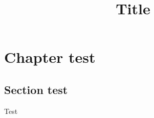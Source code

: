 \documentclass[a4paper,12pt,twoside]{book}
\title{Title}
\begin{document}
\setlength{\baselineskip}{.55cm}



\newpage
\pagestyle{intr}

\newpage

\pagestyle{toc}
\tableofcontents
\newpage

\pagestyle{toenv}
\listoftheorems
\newpage

\pagestyle{nor}
\chapter{Chapter test}
\section{Section test}
\begin{definition}
Test
\end{definition}


\medskip
\printbibliography[heading=bibintoc]
\end{document}
